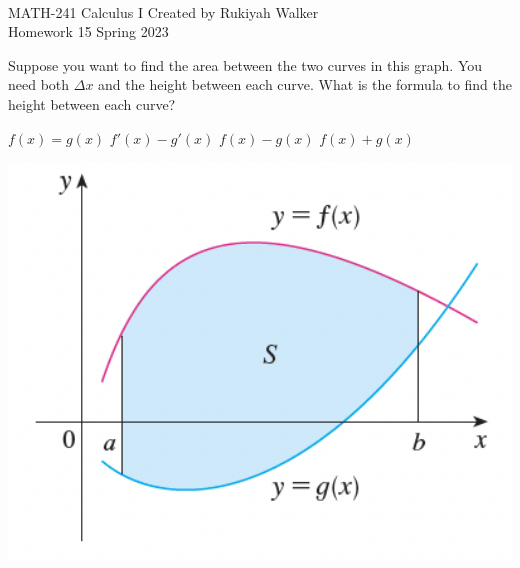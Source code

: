 \documentclass[addpoints, 12pt]{exam}%
\begin{document}
\noindent \hrulefill \\
	MATH-241 Calculus I \hfill Created by Rukiyah Walker\\
	Homework 15 \hfill Spring 2023\\ \vspace*{-1cm}
 
	\noindent\hrulefill


\begin{questions}

\vspace*{0.5cm}

\question[1]

Suppose you want to find the area between the two curves in this graph. You need both $\Delta x$ and the height between each curve. What is the formula to find the height between each curve?
\begin{minipage}{0.5\textwidth}
\begin{choices}
\choice  $f(x) = g(x)$\vspace*{10pt}
\choice $f'(x) - g'(x)$ \vspace*{10pt}
\CorrectChoice $f(x) - g(x)$ \vspace*{10pt}
\choice $f(x) + g(x)$ \vspace*{10pt}
\end{choices}
\end{minipage}
\hspace*{1cm}
\begin{minipage}{0.35\textwidth}
\includegraphics[width=1\textwidth]{HW15graph.png}
\end{minipage}


\end{questions}
\end{document}
